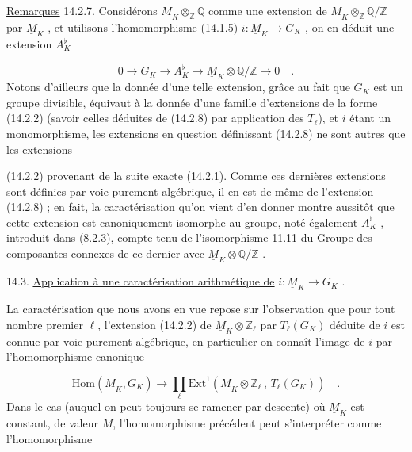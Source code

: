 \underline{Remarques} 14.2.7. Considérons $\underline{M}_K \otimes_{\mathbb{Z}} \mathbb{Q}$ comme une extension de $\underline{M}_K \otimes_{\mathbb{Z}} \mathbb{Q}/\mathbb{Z}$ par $\underline{M}_K$ , et utilisons l'homomorphisme (14.1.5) $i : \underline{M}_K \longrightarrow G_K$ , on en déduit une extension $A_K^{\flat}$

\begin{equation}\tag{14.2.8}
0 \longrightarrow G_K \longrightarrow A_K^{\flat} \longrightarrow \underline{M}_K \otimes \mathbb{Q}/\mathbb{Z} \longrightarrow 0 \quad .
\end{equation}
Notons d'ailleurs que la donnée d'une telle extension, grâce au fait que $G_K$ est un groupe divisible, équivaut à la donnée d'une famille d'extensions de la forme (14.2.2) (savoir celles déduites de (14.2.8) par application des $T_\ell$), et $i$ étant un monomorphisme, les extensions en question définissant (14.2.8) ne sont autres que les extensions



(14.2.2) provenant de la suite exacte (14.2.1). Comme ces dernières extensions sont définies par voie purement algébrique, il en est de même de l'extension (14.2.8) ; en fait, la caractérisation qu'on vient d'en donner montre aussitôt que cette extension est canoniquement isomorphe au groupe, noté également $A_K^{\flat}$ , introduit dans (8.2.3), compte tenu de l'isomorphisme 11.11 du Groupe des composantes connexes de ce dernier avec $\underline{M}_K \otimes \mathbb{Q}/\mathbb{Z}$ .


14.3. \underline{Application à une caractérisation arithmétique de} $i: \underline{M}_K \longrightarrow G_K$ .

La caractérisation que nous avons en vue repose sur l'observation que pour tout nombre premier $\ell$, l'extension (14.2.2) de $\underline{M}_K \otimes \mathbb{Z}_\ell$ par $T_\ell(G_K)$ déduite de $i$ est connue par voie purement algébrique, en particulier on connaît l'image de $i$ par l'homomorphisme canonique

\begin{equation}\tag{14.3.1}
\mathrm{Hom}(\underline{M}_K , G_K) \longrightarrow \prod_\ell \mathrm{Ext}^1(\underline{M}_K \otimes \mathbb{Z}_\ell \, , \, T_\ell(G_K)) \quad .
\end{equation}
Dans le cas (auquel on peut toujours se ramener par descente) où $\underline{M}_K$ est constant, de valeur $M$, l'homomorphisme précédent peut s'interpréter comme l'homomorphisme

